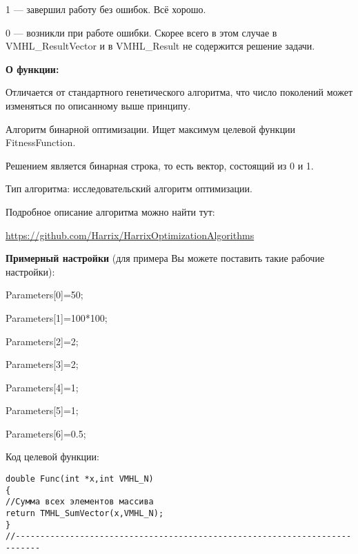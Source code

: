 \documentclass[a4paper,12pt]{article}
\begin{document}
 1 --- завершил работу без ошибок. Всё хорошо.
 
 0 --- возникли при работе ошибки. Скорее всего в этом случае в VMHL\_ResultVector и в VMHL\_Result не содержится решение задачи.

 
\textbf{О функции:}

Отличается от стандартного генетического алгоритма, что число поколений может изменяться по описанному выше принципу.

Алгоритм бинарной оптимизации. Ищет максимум целевой функции FitnessFunction.

Решением является бинарная строка, то есть вектор, состоящий из 0 и 1.

Тип алгоритма: исследовательский алгоритм оптимизации.

Подробное описание алгоритма можно найти тут:

\href{https://github.com/Harrix/HarrixOptimizationAlgorithms/blob/master/\_HarrixOptimizationAlgorithms.pdf}{https://github.com/Harrix/HarrixOptimizationAlgorithms}

\textbf{Примерный настройки} (для примера Вы можете поставить такие рабочие настройки):

 Parameters[0]=50;
 
Parameters[1]=100*100;

Parameters[2]=2;

Parameters[3]=2;

Parameters[4]=1;

Parameters[5]=1;

Parameters[6]=0.5;

Код целевой функции:
\begin{lstlisting}[caption=Оптимизируемая функция]
double Func(int *x,int VMHL_N)
{
//Сумма всех элементов массива
return TMHL_SumVector(x,VMHL_N);
}
//---------------------------------------------------------------------------
\end{lstlisting}
\end{document}
